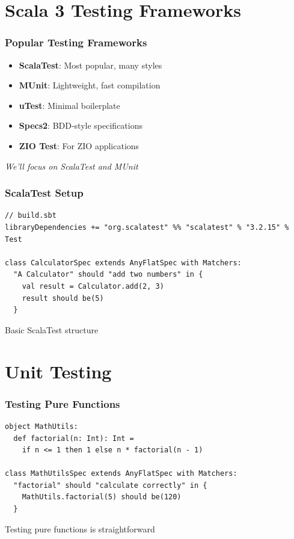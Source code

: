 \documentclass{beamer}
\begin{document}
\section{Scala 3 Testing Frameworks}

\begin{frame}
\frametitle{Popular Testing Frameworks}

\begin{itemize}
  \item \textbf{ScalaTest}: Most popular, many styles
  \item \textbf{MUnit}: Lightweight, fast compilation
  \item \textbf{uTest}: Minimal boilerplate
  \item \textbf{Specs2}: BDD-style specifications
  \item \textbf{ZIO Test}: For ZIO applications
\end{itemize}

\vspace{0.3cm}
\textit{We'll focus on ScalaTest and MUnit}

\end{frame}

\begin{frame}[fragile]
\frametitle{ScalaTest Setup}

\begin{lstlisting}[style=scalaStyle]
// build.sbt
libraryDependencies += "org.scalatest" %% "scalatest" % "3.2.15" % Test

class CalculatorSpec extends AnyFlatSpec with Matchers:
  "A Calculator" should "add two numbers" in {
    val result = Calculator.add(2, 3)
    result should be(5)
  }
\end{lstlisting}

Basic ScalaTest structure

\end{frame}

\section{Unit Testing}

\begin{frame}[fragile]
\frametitle{Testing Pure Functions}

\begin{lstlisting}[style=scalaStyle]
object MathUtils:
  def factorial(n: Int): Int = 
    if n <= 1 then 1 else n * factorial(n - 1)

class MathUtilsSpec extends AnyFlatSpec with Matchers:
  "factorial" should "calculate correctly" in {
    MathUtils.factorial(5) should be(120)
  }
\end{lstlisting}

Testing pure functions is straightforward

\end{frame}
\end{document}

